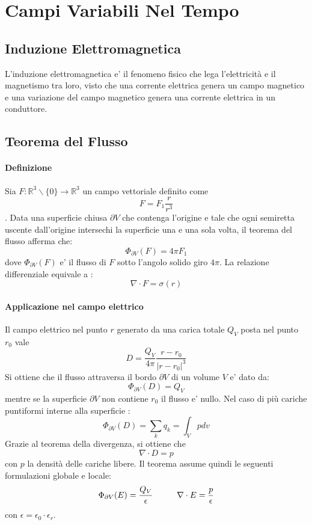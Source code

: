 \documentclass[a4paper, 10pt]{article}
\begin{document}
	\section{Campi Variabili Nel Tempo}
		\subsection{Induzione Elettromagnetica}
			L'induzione elettromagnetica e' il fenomeno fisico che lega l'elettricità e il magnetismo tra loro, 
			visto che una corrente elettrica genera un campo magnetico e una variazione del campo magnetico 
			genera una corrente elettrica in un conduttore. 
		\subsection{Teorema del Flusso}
			\paragraph*{Definizione}
				Sia $F : \mathbb{R}^3 \smallsetminus \lbrace 0 \rbrace \rightarrow \mathbb{R}^3$ un campo vettoriale definito come
				\[F = F_1 \frac{r}{r^3} \]. Data una superficie chiusa $\partial V$ che contenga l'origine e tale che ogni
				 semiretta uscente dall'origine intersechi la superficie una e una sola volta, il teorema del flusso afferma che:
				 \[ \Phi_{\partial V} (F) = 4 \pi F_1 \] dove $\Phi_{\partial V} (F)$ e' il flusso di $F$ sotto l'angolo
				 solido giro $4\pi$. La relazione differenziale equivale a :
				 \[ \nabla \cdot F = \sigma (r) \]
			\paragraph*{Applicazione nel campo elettrico}
				Il campo elettrico nel punto $r$ generato da una carica totale $Q_V$ posta nel punto $r_0$ vale
				\[ D = \frac{Q_V}{4\pi}\frac{r - r_0}{\vert r - r_0 \vert^3} \]
				Si ottiene che il flusso attraversa il bordo $\partial V$ di un volume $V$ e' dato da:
				\[ \Phi_{\partial V}(D) = Q_V \] mentre se la superficie $\partial V$ non contiene $r_0$ il flusso e' nullo. Nel
				caso di più cariche puntiformi interne alla superficie :
				\[ \Phi_{\partial V}(D) = \sum_k q_k = \int_V p dv \]
				Grazie al teorema della divergenza, si ottiene che \[ \nabla \cdot D = p\] con $p$ la densità delle cariche libere.
				Il teorema assume quindi le seguenti formulazioni globale e locale:
				\[ \Phi_{\partial V}(E) = \frac{Q_V}{\epsilon}  \hspace{1.0cm} \nabla \cdot E = \frac{p}{\epsilon} \] 
				con $\epsilon = \epsilon_0 \cdot \epsilon_r$.
\end{document}
